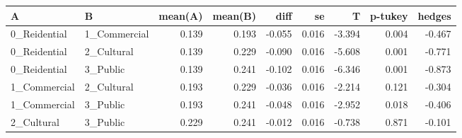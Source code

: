\begin{tabular}{llrrrrrrr}
\toprule
            A &             B &  mean(A) &  mean(B) &   diff &     se &      T &  p-tukey &  hedges \\
\midrule
 0\_Reidential &  1\_Commercial &    0.139 &    0.193 & -0.055 &  0.016 & -3.394 &    0.004 &  -0.467 \\
 0\_Reidential &    2\_Cultural &    0.139 &    0.229 & -0.090 &  0.016 & -5.608 &    0.001 &  -0.771 \\
 0\_Reidential &      3\_Public &    0.139 &    0.241 & -0.102 &  0.016 & -6.346 &    0.001 &  -0.873 \\
 1\_Commercial &    2\_Cultural &    0.193 &    0.229 & -0.036 &  0.016 & -2.214 &    0.121 &  -0.304 \\
 1\_Commercial &      3\_Public &    0.193 &    0.241 & -0.048 &  0.016 & -2.952 &    0.018 &  -0.406 \\
   2\_Cultural &      3\_Public &    0.229 &    0.241 & -0.012 &  0.016 & -0.738 &    0.871 &  -0.101 \\
\bottomrule
\end{tabular}
